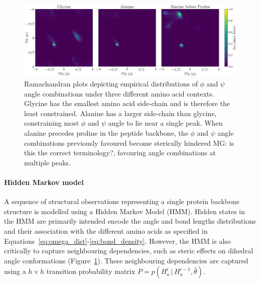 \documentclass[nogrid]{MBE}%
\newcommand{\revcom}[1]{{\color{orange} #1}}
\begin{document}
\begin{figure}
	\centering
	\includegraphics[width=2.0\columnwidth]{figures/ramachandran_empirical.pdf}
	\caption{Ramachandran plots depicting empirical distributions of $\phi$ and $\psi$ angle combinations under three different amino acid contexts. Glycine has the smallest amino acid side-chain and is therefore the least constrained. Alanine has a larger side-chain than glycine, constraining most $\phi$ and $\psi$ angle to lie near a single peak. When alanine precedes proline in the peptide backbone, the $\phi$ and $\psi$ angle combinations previously favoured become sterically hindered \revcom{MG: is this the correct terminology?}, favouring angle combinations at multiple peaks.}%
	\label{fig:ramachandranempirical}%
\end{figure}

\paragraph{Hidden Markov model}
A sequence of structural observations representing a single protein backbone structure is modelled using a Hidden Markov Model (HMM). Hidden states in the HMM are primarily intended encode the angle and bond lengths distributions and their association with the different amino acids as specified in Equations~\ref{eq:omega_dist}-\ref{eq:bond_density}. However, the HMM is also critically to capture neighbouring dependencies, such as steric effects on dihedral angle conformations (Figure~\ref{fig:ramachandranempirical}). These neighbouring dependencies are captured using a $h\times{h}$ transition probability matrix  $P=p(H_{a}^{i}\,|\,H_{a}^{i-1},\hat{\theta})$.
\end{document}
